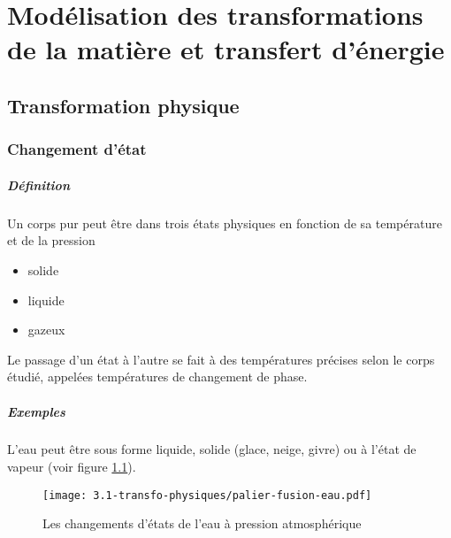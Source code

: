 
\chapter{Modélisation des transformations de la matière et transfert
d'énergie}
\section{Transformation physique}
\subsection{Changement d'état}
\paragraph{Définition}Un corps pur peut être dans trois états physiques en fonction
de sa température et de la pression
\begin{itemize}
 \item solide
 \item liquide
 \item gazeux
\end{itemize}
Le passage d'un état à l'autre se fait à des températures précises selon le corps
étudié, appelées températures de changement de phase.

\paragraph{Exemples}
L'eau peut être sous forme liquide, solide (glace, neige, givre) ou à l'état 
de vapeur (voir figure \ref{fig:eau_changement_etat}).
\begin{figure}[!h]
  \begin{center}
      \texttt{[image: 3.1-transfo-physiques/palier-fusion-eau.pdf]}
  \end{center}
  \caption{Les changements d'états de l'eau à pression atmosphérique}
  \label{fig:eau_changement_etat}
\end{figure}

